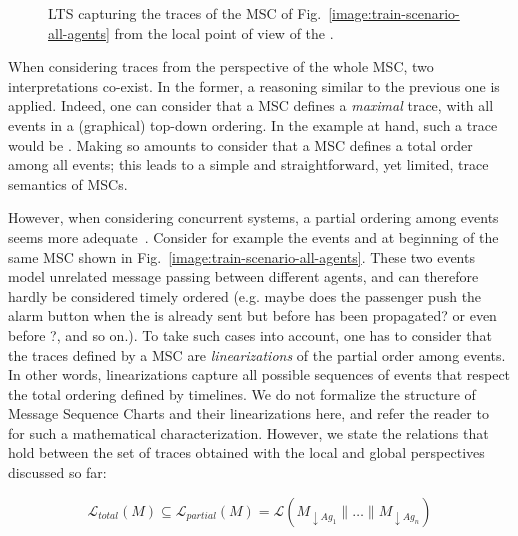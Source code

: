 \vspace{0.5cm}
\begin{figure}[H]\centering
{}
\caption{LTS capturing the traces of the MSC of Fig.~\ref{image:train-scenario-all-agents} from the local point of view of the .\label{image:local-traces-lts}}
\end{figure}

When considering traces from the perspective of the whole MSC, two interpretations co-exist. In the former, a reasoning similar to the previous one is applied. Indeed, one can consider that a MSC defines a \emph{maximal} trace, with all events in a (graphical) top-down ordering. In the example at hand, such a trace would be . Making so amounts to consider that a MSC defines a total order among all events; this leads to a simple and straightforward, yet limited, trace semantics of MSCs.

However, when considering concurrent systems, a partial ordering among events seems more adequate~\cite{ITU:1996, Uchitel:2003}. Consider for example the events  and  at beginning of the same MSC shown in Fig.~\ref{image:train-scenario-all-agents}. These two events model unrelated message passing between different agents, and can therefore hardly be considered timely ordered (e.g. maybe does the passenger push the alarm button when the  is already sent but before  has been propagated? or even before ?, and so on.). To take such cases into account, one has to consider that the traces defined by a MSC are \emph{linearizations} of the partial order among events. In other words, linearizations capture all possible sequences of events that respect the total ordering defined by timelines. We do not formalize the structure of Message Sequence Charts and their linearizations here, and refer the reader to~\cite{Uchitel:2003} for such a mathematical characterization. However, we state the relations that hold between the set of traces obtained with the local and global perspectives discussed so far:

\vspace{-0.4cm}
\begin{equation}
\label{equation:msc-composition}
\mathcal{L}_{total}(M) \subseteq \mathcal{L}_{partial}(M) = \mathcal{L}(M_{\downarrow Ag_1} \parallel \ldots \parallel M_{\downarrow Ag_n})
\end{equation}

